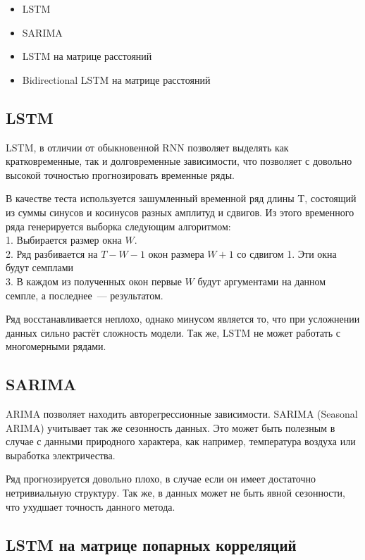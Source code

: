 \documentclass{article}
\begin{document}
\begin{itemize}
	\item LSTM \cite{LSTM}
	\item SARIMA \cite{ARIMAvsLSTM}
	\item LSTM на матрице расстояний
	\item Bidirectional LSTM на матрице расстояний
\end{itemize}

\subsection{LSTM}

LSTM, в отличии от обыкновенной RNN позволяет выделять как кратковременные, так и долговременные зависимости, что позволяет с довольно высокой точностью прогнозировать временные ряды.

В качестве теста используется зашумленный временной ряд длины T, состоящий из суммы синусов и косинусов разных амплитуд и сдвигов. Из этого временного ряда генерируется выборка следующим алгоритмом:\\
1. Выбирается размер окна $W$.\\
2. Ряд разбивается на $T-W-1$ окон размера $W+1$ со сдвигом 1. Эти окна будут семплами\\
3. В каждом из полученных окон первые $W$ будут аргументами на данном семпле, а последнее~--- результатом.

Ряд восстанавливается неплохо, однако минусом является то, что при усложнении данных сильно растёт сложность модели. Так же, LSTM не может работать с многомерными рядами.

\subsection{SARIMA}

ARIMA позволяет находить авторегрессионные зависимости. SARIMA (Seasonal ARIMA) учитывает так же сезонность данных. Это может быть полезным в случае с данными природного характера, как например, температура воздуха или выработка электричества.

Ряд прогнозируется довольно плохо, в случае если он имеет достаточно нетривиальную структуру. Так же, в данных может не быть явной сезонности, что ухудшает точность данного метода.

\subsection{LSTM на матрице попарных корреляций}
\end{document}
